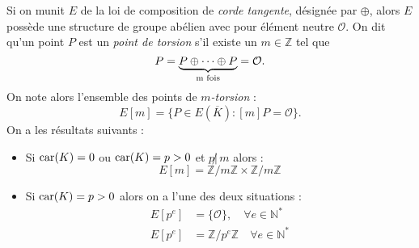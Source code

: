 \documentclass[a4paper]{article} %
\numberwithin{section}{part}
\numberwithin{equation}{section}
\newcommand\zmodn[1]{\mathbb{Z}/#1\mathbb{Z}}
\newcommand\ZZ{\mathbb{Z}}
\newcommand\NN{\mathbb{N}}
\newcommand\EO{\mathcal{O}}
\begin{document}
\vspace{0.3cm}
Si on munit $E$ de la loi de composition de \emph{corde tangente}, désignée par
$\oplus$, alors $E$ possède une structure de groupe abélien avec pour élément 
neutre $\EO$. On dit qu'un point $P$ est un \emph{point de torsion} s'il existe 
un $m\in\ZZ$ tel que 
\begin{equation}
[m]P = \underbrace{P\oplus\dots\oplus P}_{\textup{m fois}} = \EO.
\end{equation}
On note alors l'ensemble des points de \emph{$m$-torsion} :
\begin{equation}
E[m] = \lbrace{P\in E(\overline{K}) : [m]P = \EO}\rbrace.
\end{equation}
On a les résultats suivants :
\vspace{0.3cm}
\begin{itemize}
\item Si $\textup{car}(K) = 0$ ou $\textup{car}(K) = p > 0$ et $p\not|\,m$ 
alors :
\begin{equation}
E[m] = \zmodn{m}\times\zmodn{m}
\end{equation}
\item Si $\textup{car}(K) = p > 0$ alors on a l'une des deux situations :
    \begin{align} 
    E[p^e] &= \lbrace{\EO}\rbrace, \quad \forall e\in\NN^{*}\\
    E[p^e] &= \zmodn{p^e}\quad \forall e\in\NN^{*}
    \end{align}
\end{itemize}
\vspace{0.3cm}
\end{document}
